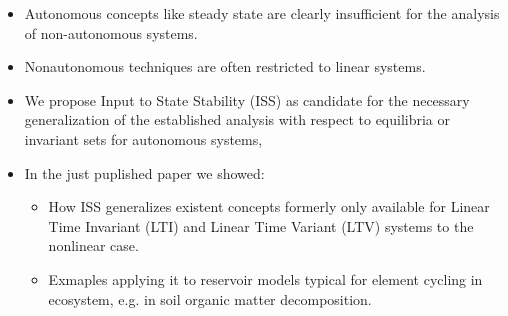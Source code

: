 
\noindent
\begin{itemize}
  \item
  Autonomous concepts like steady state are clearly insufficient for the analysis of non-autonomous systems.
  \item 
  Nonautonomous techniques are often restricted to linear systems.
  \item
  We propose Input to State Stability (ISS) as
  candidate for the necessary generalization of the established analysis with
  respect to equilibria or invariant sets for autonomous systems, 
  \item 
  In the just puplished  paper \cite{MuellerSierra2017TE} 
  we showed: 
  \begin{itemize}
  \item 
    How ISS generalizes existent concepts formerly only available for Linear Time Invariant (LTI) 
  and Linear Time Variant (LTV) systems to the nonlinear case. 
  \item 
    Exmaples applying it to reservoir models typical for element cycling in
  ecosystem, e.g. in soil organic matter decomposition.  
  \end{itemize}
\end{itemize}
